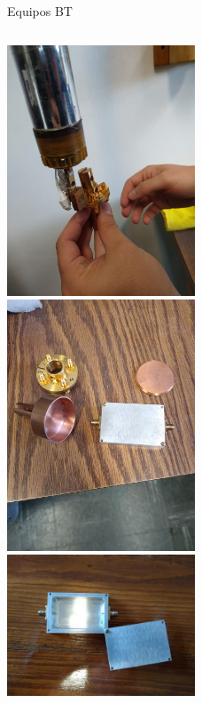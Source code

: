 \documentclass[ignorenonframetext,12pt]{beamer}
\begin{document}
\begin{frame}{Equipos BT}
\begin{columns}
\begin{column}{0.45\textwidth}
												\includegraphics[angle=-90,width=0.42\textwidth]{IMG_20190523_105647049} \\ 
												\hspace{2mm}\includegraphics[angle=-90,width=0.42\textwidth]{IMG_20190523_112752228} \\
												\includegraphics[angle=-90,width=0.42\textwidth]{IMG_20190523_104038976}
								\end{column}
				\end{columns}
\end{frame}
\end{document}
